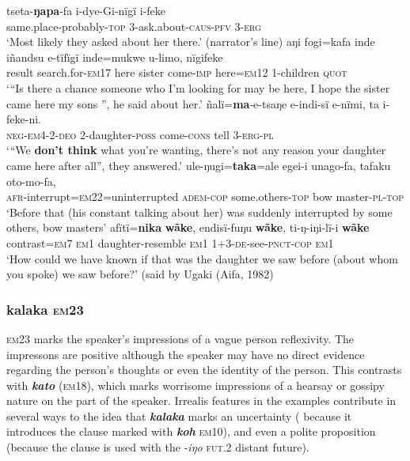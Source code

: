 \documentclass[output=paper]{langsci/langscibook}
\begin{document}
\begin{exe}
\ex \label{ex:eb55}
	\begin{xlist}
	\ex \label{ex:eb55a}
	\gll tseta-\textbf{ŋapa}-fa i-dye-Gi-nïgï i-feke\\
	same.place-probably-\textsc{top} 3-ask.about-\textsc{caus-pfv} 3-\textsc{erg}\\
	\trans ‘Most likely they asked about her there.’ (narrator’s line)
	\ex \label{ex:eb55b}
	\gll aŋi fogi=kafa inde iñandsu e-tïfïgï inde=mukwe u-limo, nïgifeke\\
	result search.for-\textsc{em17} here  sister come-\textsc{imp} here=\textsc{em12} 1-children \textsc{quot}\\
	\trans ‘“Is there a chance someone who I’m looking for may be here, I hope the sister came here my sons ”, he said about her.’
	\ex \label{ex:eb55c}
	\gll ñalï=\textbf{ma}-e-tsaŋe e-indi-sï e-nïmi, ta i-feke-ni.\\
	\textsc{neg-em4-2-deo} 2-daughter-\textsc{poss} come-\textsc{cons} tell 3-\textsc{erg-pl}\\ 
	\trans `“We \textbf{don’t think} what you’re wanting, there’s not any reason your daughter came here after all”, they answered.'
	\ex \label{ex:eb55d}
	\gll ule-ŋugi=\textbf{taka}=ale egei-i unago-fa, tafaku oto-mo-fa,\\
	\textsc{afr}-interrupt=\textsc{em22}=uninterrupted \textsc{adem-cop} some.others-\textsc{top} bow master-\textsc{pl-top}\\
	\trans ‘Before that (his constant talking about her) was suddenly interrupted by some others, bow masters'
	\ex \label{ex:eb55e}
	\gll afïtï=\textbf{nika} \textbf{wãke}, endisï-fuŋu \textbf{wãke}, ti-ŋ-iŋi-lï-i \textbf{wãke}\\
	contrast=\textsc{em7} \textsc{em1} daughter-resemble \textsc{em1} 1+3-\textsc{de}-see-\textsc{pnct}-\textsc{cop} \textsc{em1}\\
	\trans ‘How could we have known if that was the daughter we saw before (about whom you spoke) we saw before?' (said by Ugaki (Aifa, 1982)
\end{xlist}
\end{exe}

\subsubsection{kalaka \textsc{em}23} 
\textsc{em}23 marks the speaker’s impressions of a vague  person reflexivity.  The impressons are positive although the speaker may have no direct evidence regarding the  person’s thoughts or even the identity of the person.  This contrasts with \textbf{\textit{kato}} (\textsc{em}18), which marks worrisome impressions of a hearsay or gossipy nature on the part of the speaker.  Irrealis features in the examples contribute in several ways to the idea that \textbf{\textit{kalaka}}  marks an uncertainty ( because it introduces the clause marked with \textbf{\textit{koh}} \textsc{em}10),  and even a polite proposition (because the clause is used with the -\textit{iŋo} \textsc{fut}.2 distant future). 
\end{document}
